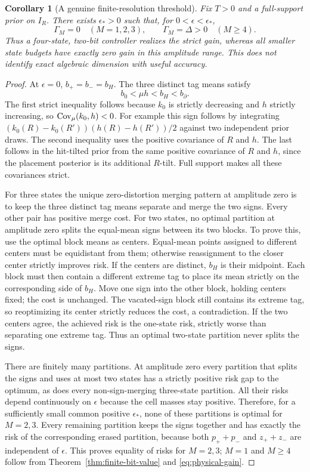 \documentclass[11pt]{amsart}
\newtheorem{corollary}[theorem]{Corollary}
\theoremstyle{definition}\newtheorem{definition}[theorem]{Definition}
\theoremstyle{remark}\newtheorem{remark}[theorem]{Remark}
\begin{document}
\begin{corollary}[A genuine finite-resolution threshold]\label{cor:threshold}
Fix $T>0$ and a full-support prior on $I_R$. There exists
$\epsilon_*>0$ such that, for $0<\epsilon<\epsilon_*$,
\begin{equation}\label{eq:threshold}
 \Gamma_M=0\quad(M=1,2,3),\qquad
 \Gamma_M=\Delta>0\quad(M\ge4).
\end{equation}
Thus a four-state, two-bit controller realizes the strict gain, whereas
all smaller state budgets have exactly zero gain in this amplitude range.
This does not identify exact algebraic dimension with useful accuracy.
\end{corollary}
\begin{proof}
At $\epsilon=0$, $b_+=b_-=b_H$. The three distinct tag means satisfy
\[
 b_0<\mu h<b_H<b_\partial.
\]
The first strict inequality follows because $k_0$ is strictly decreasing
and $h$ strictly increasing, so $\operatorname{Cov}_\mu(k_0,h)<0$.
For example this sign follows by integrating
$(k_0(R)-k_0(R'))(h(R)-h(R'))/2$ against two independent prior draws.
The second inequality uses the positive covariance of $R$ and $h$.
The last follows in the hit-tilted prior from the same positive covariance
of $R$ and $h$, since the placement posterior is its additional $R$-tilt.
Full support makes all these covariances strict.

For three states the unique zero-distortion merging pattern at amplitude
zero is to keep the three distinct tag means separate and merge the two
signs. Every other pair has positive merge cost. For two states, no optimal
partition at amplitude zero splits the equal-mean signs between its two
blocks. To prove this, use the optimal block means as centers. Equal-mean
points assigned to different centers must be equidistant from them;
otherwise reassignment to the closer center strictly improves risk.
If the centers are distinct, $b_H$ is their midpoint. Each block must
then contain a different extreme tag to place its mean strictly on the
corresponding side of $b_H$. Move one sign into the other block, holding
centers fixed; the cost is unchanged. The vacated-sign block still contains
its extreme tag, so reoptimizing its center strictly reduces the cost,
a contradiction. If the two centers agree, the achieved risk is the
one-state risk, strictly worse than separating one extreme tag. Thus an
optimal two-state partition never splits the signs.

There are finitely many partitions. At amplitude zero every partition
that splits the signs and uses at most two states has a strictly positive
risk gap to the optimum, as does every non-sign-merging three-state
partition. All their risks depend continuously on $\epsilon$ because
the cell masses stay positive. Therefore, for a sufficiently small common
positive $\epsilon_*$, none of these partitions is optimal for $M=2,3$.
Every remaining partition keeps the signs together and has exactly the
risk of the corresponding erased partition, because both $p_++p_-$
and $z_++z_-$ are independent of $\epsilon$. This proves equality of
risks for $M=2,3$; $M=1$ and $M\ge4$ follow from
Theorem~\ref{thm:finite-bit-value} and \eqref{eq:physical-gain}.
\end{proof}
\end{document}
